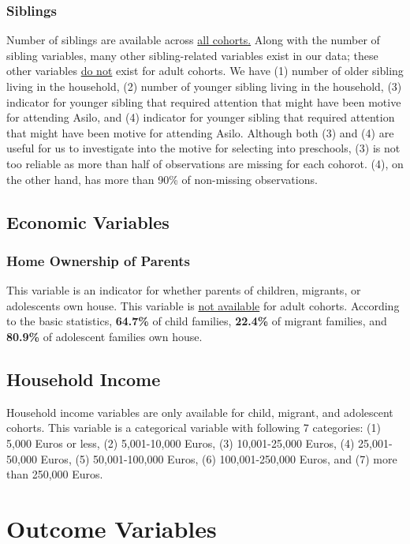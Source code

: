 \documentclass[12pt]{article}
\begin{document}
\subsubsection{Siblings} 
Number of siblings are available across \underline{all cohorts.} Along with the number of sibling variables, many other sibling-related variables exist in our data; these other variables \underline{do not} exist for adult cohorts. We have (1) number of older sibling living in the household, (2) number of younger sibling living in the household, (3) indicator for younger sibling that required attention that might have been motive for attending Asilo, and (4) indicator for younger sibling that required attention that might have been motive for attending Asilo. Although both (3) and (4) are useful for us to investigate into the motive for selecting into preschools, (3) is not too reliable as more than half of observations are missing for each cohorot. (4), on the other hand, has more than 90\% of non-missing observations.

\subsection{Economic Variables}
\subsubsection{Home Ownership of Parents} This variable is an indicator for whether parents of children, migrants, or adolescents own house. This variable is \underline{not available} for adult cohorts. According to the basic statistics, \textbf{64.7\%} of child families, \textbf{22.4\%} of migrant families, and \textbf{80.9\%} of adolescent families own house.

\subsection{Household Income} 
Household income variables are only available for child, migrant, and adolescent cohorts. This variable is a categorical variable with following 7 categories: (1) 5,000 Euros or less, (2) 5,001-10,000 Euros, (3) 10,001-25,000 Euros, (4) 25,001-50,000 Euros, (5) 50,001-100,000 Euros, (6) 100,001-250,000 Euros, and (7) more than 250,000 Euros. 

\section{Outcome Variables}
\end{document}
